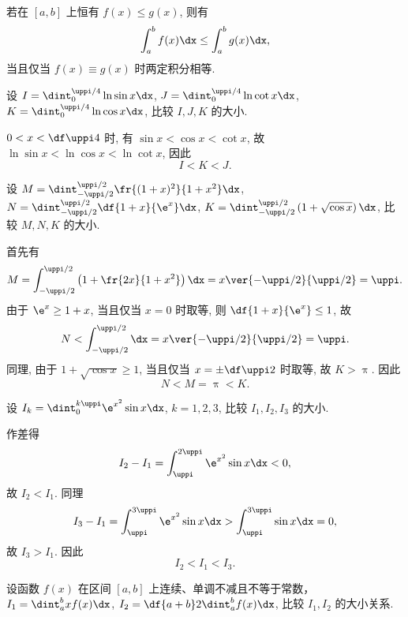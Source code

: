 \documentclass{ctexart}
\begin{document}
\begin{theorem}[定积分的保序性]
    若在 $[a,b]$ 上恒有 $f(x)\le g(x)$, 则有 \[
        \int_a^bf(x)\dx\le\int_a^bg(x)\dx,
    \] 当且仅当 $f(x)\equiv g(x)$ 时两定积分相等.
\end{theorem}

\begin{exercise}
    设 $I=\dint_0^{\uppi/4}\ln\sin x\dx$, $J=\dint_0^{\uppi/4}\ln\cot x\dx$, $K=\dint_0^{\uppi/4}\ln\cos x\dx$, 比较 $I,J,K$ 的大小.
\end{exercise}

\begin{solution}
    $0<x<\df\uppi4$ 时, 有 $\sin x<\cos x<\cot x$, 故 $\ln\sin x<\ln\cos x<\ln\cot x$, 因此 \[
        I<K<J.
    \]
\end{solution}

\begin{exercise}
    设 $M=\dint_{-\uppi/2}^{\uppi/2}\fr{(1+x)^2}{1+x^2}\dx$, $N=\dint_{-\uppi/2}^{\uppi/2}\df{1+x}{\e^x}\dx$, $K=\dint_{-\uppi/2}^{\uppi/2}\left(1+\sqrt{\cos x}\right)\dx$, 比较 $M,N,K$ 的大小.
\end{exercise}

\begin{solution}
    首先有 \[
        M=\int_{-\uppi/2}^{\uppi/2}\left(1+\fr{2x}{1+x^2}\right)\dx=x\ver{-\uppi/2}{\uppi/2}=\uppi.
    \] 由于 $\e^x\ge1+x$, 当且仅当 $x=0$ 时取等, 则 $\df{1+x}{\e^x}\le1$, 故 \[
        N<\int_{-\uppi/2}^{\uppi/2}\dx=x\ver{-\uppi/2}{\uppi/2}=\uppi.
    \] 同理, 由于 $1+\sqrt{\cos x}\ge1$, 当且仅当 $x=\pm\df\uppi2$ 时取等, 故 $K>\uppi$. 因此 \[
        N<M=\uppi<K.
    \]
\end{solution}

\begin{exercise}
    设 $I_k=\dint_0^{k\uppi}\e^{x^2}\sin x\dx$, $k=1,2,3$, 比较 $I_1,I_2,I_3$ 的大小.
\end{exercise}

\begin{solution}
    作差得 \[
        I_2-I_1=\int_\uppi^{2\uppi}\e^{x^2}\sin x\dx<0,
    \] 故 $I_2<I_1$. 同理 \[
        I_3-I_1=\int_\uppi^{3\uppi}\e^{x^2}\sin x\dx>\int_\uppi^{3\uppi}\sin x\dx=0,
    \] 故 $I_3>I_1$. 因此 \[
        I_2<I_1<I_3.
    \]
\end{solution}

\begin{exercise}
    设函数 $f(x)$ 在区间 $[a,b]$ 上连续、单调不减且不等于常数，$I_1=\dint_a^bxf(x)\dx$, $I_2=\df{a+b}2\dint_a^bf(x)\dx$, 比较 $I_1,I_2$ 的大小关系.
\end{exercise}
\end{document}

